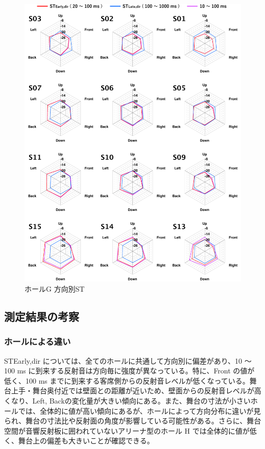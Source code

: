 \documentclass[11pt,a4j]{jreport}
\begin{document}
\newpage

\begin{figure}[H]
  \centering
  \includegraphics[scale=.77]{images/realHallDirSt/allPoint/reshaped/gRightPage.pdf}
  \caption{ホールG 方向別ST}
  \label{fig:ホールG 方向別ST}
\end{figure}

\clearpage

\subsection*{測定結果の考察}

\subsubsection{ホールによる違い}

STEarly,dir については、全てのホールに共通して方向別に偏差があり、10 ～ 100 ms に到来する反射音は方向毎に強度が異なっている。特に、Front の値が低く、100 ms までに到来する客席側からの反射音レベルが低くなっている。舞台上手・舞台奥付近では壁面との距離が近いため、壁面からの反射音レベルが高くなり、Left, Backの変化量が大きい傾向にある。また、舞台の寸法が小さいホールでは、全体的に値が高い傾向にあるが、ホールによって方向分布に違いが見られ、舞台の寸法比や反射面の角度が影響している可能性がある。さらに、舞台空間が音響反射板に囲われていないアリーナ型のホール H では全体的に値が低く、舞台上の偏差も大きいことが確認できる。
\end{document}
